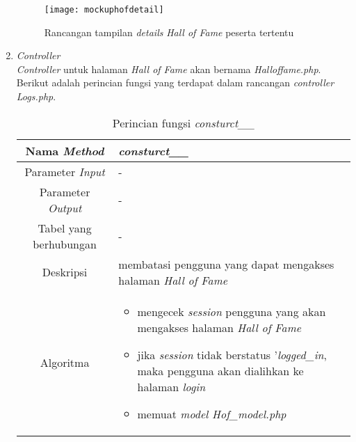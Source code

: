 \begin{enumerate}
	\begin{figure}[H]
		\centering  
		\texttt{[image: mockuphofdetail]}  
		\caption[Rancangan tampilan \textit{details} \textit{Hall of Fame} peserta tertentu]{Rancangan tampilan \textit{details} \textit{Hall of Fame} peserta tertentu} 
		\label{fig:mockuphofdetail} 
	\end{figure}
	
	\item \textit{Controller} \\
	\textit{Controller} untuk halaman \textit{Hall of Fame} akan bernama \textit{Halloffame.php}. Berikut adalah perincian fungsi yang terdapat dalam rancangan \textit{controller Logs.php}.
	\begin{table}[H]
		\caption{Perincian fungsi \textit{consturct\_\_}}
		\begin{tabular}{|c|p{11cm}|}
			\hline
			Nama \textit{Method} 	& 	\textit{consturct\_\_} 	\\
			\hline
			Parameter \textit{Input} & - \\
			\hline
			Parameter \textit{Output} &  - \\
			\hline
			Tabel yang berhubungan & - \\
			\hline
			Deskripsi	& membatasi pengguna yang dapat mengakses halaman \textit{Hall of Fame}	 \\
			\hline
			Algoritma	& \begin{itemize}
				\item mengecek \textit{session} pengguna yang akan mengakses halaman \textit{Hall of Fame}
				\item jika \textit{session} tidak berstatus '\textit{logged\_in}, maka pengguna akan dialihkan ke halaman \textit{login}
				\item memuat \textit{model Hof\_model.php}
			\end{itemize} \\
			\hline
		\end{tabular}
	\end{table}
	

\end{enumerate}
